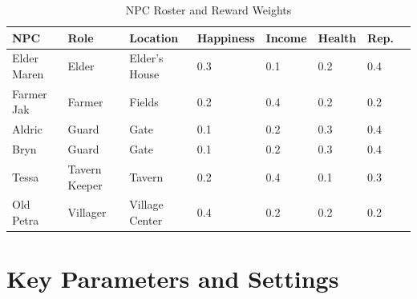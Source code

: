 \documentclass[12pt, a4paper, oneside]{report}
\begin{document}
\begin{table}[H]
\centering
\caption{NPC Roster and Reward Weights}
\label{tab:npc_roster}
\begin{tabular}{llllllll}
\toprule
\textbf{NPC} & \textbf{Role} & \textbf{Location} & \textbf{Happiness} & \textbf{Income} & \textbf{Health} & \textbf{Rep.} \\
\midrule
Elder Maren & Elder & Elder's House & 0.3 & 0.1 & 0.2 & 0.4 \\
Farmer Jak & Farmer & Fields & 0.2 & 0.4 & 0.2 & 0.2 \\
Aldric & Guard & Gate & 0.1 & 0.2 & 0.3 & 0.4 \\
Bryn & Guard & Gate & 0.1 & 0.2 & 0.3 & 0.4 \\
Tessa & Tavern Keeper & Tavern & 0.2 & 0.4 & 0.1 & 0.3 \\
Old Petra & Villager & Village Center & 0.4 & 0.2 & 0.2 & 0.2 \\
\bottomrule
\end{tabular}
\end{table}

\section{Key Parameters and Settings}
\label{sec:parameters}
\end{document}

